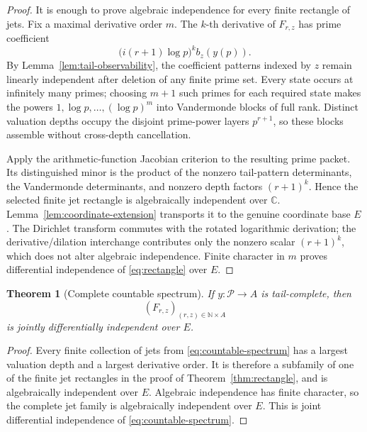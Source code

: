 \documentclass[11pt]{article}
\newtheorem{theorem}{Theorem}[section]
\theoremstyle{definition}
\theoremstyle{remark}
\newcommand{\C}{\mathbb C}
\newcommand{\N}{\mathbb N}
\newcommand{\cP}{\mathcal P}
\begin{document}
\begin{proof}
It is enough to prove algebraic independence for every finite rectangle of jets.  Fix a maximal
derivative order \(m\).  The \(k\)-th derivative of \(F_{r,z}\) has prime coefficient
\[
 \bigl(i(r+1)\log p\bigr)^k b_z(y(p)).
\]
By Lemma~\ref{lem:tail-observability}, the coefficient patterns indexed by \(z\) remain linearly
independent after deletion of any finite prime set.  Every state occurs at infinitely many
primes; choosing \(m+1\) such primes for each required state makes the powers
\(1,\log p,\ldots,(\log p)^m\) into Vandermonde blocks of full rank.  Distinct valuation depths
occupy the disjoint prime-power layers \(p^{r+1}\), so these blocks assemble without cross-depth
cancellation.

Apply the arithmetic-function Jacobian criterion to the resulting prime packet.  Its distinguished
minor is the product of the nonzero tail-pattern determinants, the Vandermonde determinants, and
nonzero depth factors \((r+1)^k\).  Hence the selected finite jet rectangle is algebraically
independent over \(\C\).  Lemma~\ref{lem:coordinate-extension} transports it to the genuine
coordinate base \(E\).  The Dirichlet transform commutes with the rotated logarithmic derivation;
the derivative/dilation interchange contributes only the nonzero scalar \((r+1)^k\), which does
not alter algebraic independence.  Finite character in \(m\) proves differential independence of
\eqref{eq:rectangle} over \(E\).
\end{proof}

\begin{theorem}[Complete countable spectrum]\label{thm:countable-spectrum}
If \(y:\cP\to A\) is tail-complete, then
\begin{equation}\label{eq:countable-spectrum}
 (F_{r,z})_{(r,z)\in\N\times A}
\end{equation}
is jointly differentially independent over \(E\).
\end{theorem}

\begin{proof}
Every finite collection of jets from \eqref{eq:countable-spectrum} has a largest valuation depth
and a largest derivative order.  It is therefore a subfamily of one of the finite jet rectangles
in the proof of Theorem~\ref{thm:rectangle}, and is algebraically independent over \(E\).
Algebraic independence has finite character, so the complete jet family is algebraically
independent over \(E\).  This is joint differential independence of
\eqref{eq:countable-spectrum}.
\end{proof}
\end{document}
